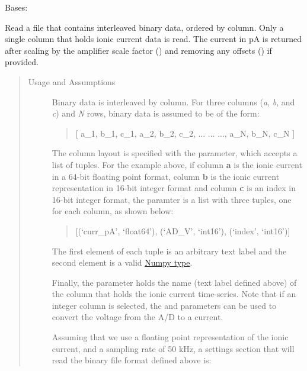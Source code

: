 \documentclass[letterpaper,10pt,english]{sphinxmanual}
\begin{document}
\begin{fulllineitems}
\label{api-doc/mosaic.traj:mosaic.binTrajIO.binTrajIO}
Bases: {\hyperref[api\string-doc/mosaic.meta:mosaic.metaTrajIO.metaTrajIO]{\emph{}}}

Read a file that contains interleaved binary data, ordered by column. Only a single 
column that holds ionic current data is read. The current in pA 
is returned after scaling by the amplifier scale factor () and 
removing any offsets () if provided.
\begin{quote}\begin{description}
\item[{Usage and Assumptions}] \leavevmode
Binary data is interleaved by column. For three columns (\emph{a}, \emph{b}, and \emph{c}) and \emph{N} rows, 
binary data is assumed to be of the form:
\begin{quote}

{[} a\_1, b\_1, c\_1, a\_2, b\_2, c\_2, ... ... ..., a\_N, b\_N, c\_N {]}
\end{quote}

The column layout is specified with the  parameter, which accepts a list of tuples. 
For the example above, if column \textbf{a} is the ionic current in a 64-bit floating point format, 
column \textbf{b} is the ionic current representation in 16-bit integer format and column \textbf{c} is 
an index in 16-bit integer format, the  paramter is a list with three 
tuples, one for each column, as shown below:
\begin{quote}

{[}(`curr\_pA', `float64'), (`AD\_V', `int16'), (`index', `int16'){]}
\end{quote}

The first element of each tuple is an arbitrary text label and the second element is 
a valid \href{http://docs.scipy.org/doc/numpy/user/basics.types.html}{Numpy type}.

Finally, the  parameter holds the name (text label defined above) of the 
column that holds the ionic current time-series. Note that if an integer column is selected, 
the  and  parameters can be used to convert the voltage from 
the A/D to a current.

Assuming that we use a floating point representation of the ionic current, and
a sampling rate of 50 kHz, a settings section that will read the binary file format 
defined above is:


\end{description}
\end{quote}
\end{fulllineitems}
\end{document}
